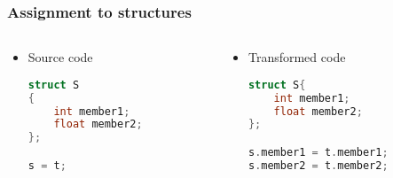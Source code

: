 \documentclass{beamer}
\begin{document}
\begin{frame}[fragile]
    \frametitle{Assignment to structures}

    \begin{columns}
        \begin{column}[]{0.5\textwidth}
            \begin{itemize}
                \item Source code
                      \begin{lstlisting}[language=C]
struct S
{
    int member1;
    float member2;
};

s = t;
                    \end{lstlisting}
            \end{itemize}

        \end{column}

        \begin{column}[]{0.5\textwidth}
            \begin{itemize}
                \item Transformed code
                      \begin{lstlisting}[language=C]
struct S{
    int member1;
    float member2;
};

s.member1 = t.member1;
s.member2 = t.member2;
                \end{lstlisting}
            \end{itemize}
        \end{column}
    \end{columns}

\end{frame}
\end{document}
